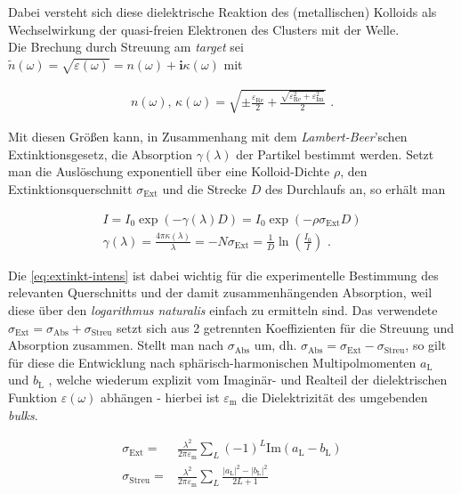 \documentclass[numbers=noenddot,a4paper,notitlepage,twoside,BCOR15mm]{scrartcl}
\newcommand{\ix}[1]{_\text{#1}}
\newcommand{\imag}{\mathbf{i}}
\newcommand{\tilt}[1]{\textit{#1}}
\begin{document}
				Dabei versteht sich diese dielektrische Reaktion des (metallischen) Kolloids als Wechselwirkung der quasi-freien Elektronen des Clusters mit der Welle.\\
				Die Brechung durch Streuung am \tilt{target} sei $\tilde{n}\left(\omega\right)=\sqrt{\varepsilon\left(\omega\right)}=n\left(\omega\right)+\imag\kappa\left(\omega\right)$ mit

					\begin{align}
						n\left(\omega\right),\, \kappa\left(\omega\right)= \sqrt{\pm\frac{\varepsilon\ix{Re}}{2}+\frac{\sqrt{\varepsilon\ix{Re}^2+\varepsilon\ix{Im}^2}}{2}}\,\,. \label{eq:kappan}
					\end{align}

				Mit diesen Größen kann, in Zusammenhang mit dem \tilt{Lambert-Beer}'schen Extinktionsgesetz, die Absorption $\gamma\left(\lambda\right)$ der Partikel bestimmt werden. Setzt man die Auslöschung exponentiell über eine Kolloid-Dichte $\rho$, den Extinktionsquerschnitt $\sigma\ix{Ext}$ und die Strecke $D$ des Durchlaufs an, so erhält man

				\begin{align}
					I=I\ix{0}\exp\left(-\gamma\left(\lambda\right)D\right)=I\ix{0}\exp\left(-\rho\sigma\ix{Ext}D\right) \\
					\gamma\left(\lambda\right)=\frac{4\pi\kappa\left(\lambda\right)}{\lambda}=-N\sigma\ix{Ext}=\frac{1}{D}\ln\left(\frac{I\ix{0}}{I}\right) \label{eq:extinkt-intens} \,\,.
				\end{align}

			Die \autoref{eq:extinkt-intens} ist dabei wichtig für die experimentelle Bestimmung des relevanten Querschnitts und der damit zusammenhängenden Absorption, weil diese über den \tilt{logarithmus naturalis} einfach zu ermitteln sind. Das verwendete $\sigma\ix{Ext}=\sigma\ix{Abs}+\sigma\ix{Streu}$ setzt sich aus 2 getrennten Koeffizienten für die Streuung und Absorption zusammen. Stellt man nach $\sigma\ix{Abs}$ um, dh. $\sigma\ix{Abs}=\sigma\ix{Ext}-\sigma\ix{Streu}$, so gilt für diese die Entwicklung nach sphärisch-harmonischen Multipolmomenten $a\ix{L}$ und $b\ix{L}$ , welche wiederum explizit vom Imaginär- und Realteil der dielektrischen Funktion $\varepsilon\left(\omega\right)$ abhängen - hierbei ist $\varepsilon\ix{m}$ die Dielektrizität des umgebenden \tilt{bulks}.

				\begin{align}
					\sigma\ix{Ext}=&\frac{\lambda^2}{2\pi\varepsilon\ix{m}}\sum_{L}\left(-1\right)^{L}\text{Im}\left(a\ix{L}-b\ix{L}\right)\\
					\sigma\ix{Streu}=&\frac{\lambda^2}{2\pi\varepsilon\ix{m}}\sum_{L}\frac{|a\ix{L}|^2-|b\ix{L}|^2}{2L+1}
				\end{align}
\end{document}
